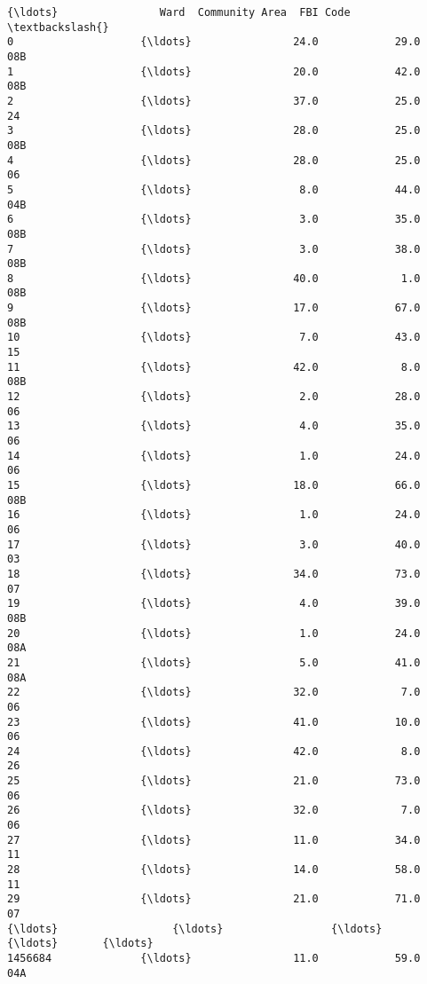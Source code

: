 \documentclass[11pt]{article}
\begin{document}
\begin{Verbatim}[commandchars=\\\{\}]
                     {\ldots}                Ward  Community Area  FBI Code  \textbackslash{}
0                    {\ldots}                24.0            29.0       08B   
1                    {\ldots}                20.0            42.0       08B   
2                    {\ldots}                37.0            25.0        24   
3                    {\ldots}                28.0            25.0       08B   
4                    {\ldots}                28.0            25.0        06   
5                    {\ldots}                 8.0            44.0       04B   
6                    {\ldots}                 3.0            35.0       08B   
7                    {\ldots}                 3.0            38.0       08B   
8                    {\ldots}                40.0             1.0       08B   
9                    {\ldots}                17.0            67.0       08B   
10                   {\ldots}                 7.0            43.0        15   
11                   {\ldots}                42.0             8.0       08B   
12                   {\ldots}                 2.0            28.0        06   
13                   {\ldots}                 4.0            35.0        06   
14                   {\ldots}                 1.0            24.0        06   
15                   {\ldots}                18.0            66.0       08B   
16                   {\ldots}                 1.0            24.0        06   
17                   {\ldots}                 3.0            40.0        03   
18                   {\ldots}                34.0            73.0        07   
19                   {\ldots}                 4.0            39.0       08B   
20                   {\ldots}                 1.0            24.0       08A   
21                   {\ldots}                 5.0            41.0       08A   
22                   {\ldots}                32.0             7.0        06   
23                   {\ldots}                41.0            10.0        06   
24                   {\ldots}                42.0             8.0        26   
25                   {\ldots}                21.0            73.0        06   
26                   {\ldots}                32.0             7.0        06   
27                   {\ldots}                11.0            34.0        11   
28                   {\ldots}                14.0            58.0        11   
29                   {\ldots}                21.0            71.0        07   
{\ldots}                  {\ldots}                 {\ldots}             {\ldots}       {\ldots}   
1456684              {\ldots}                11.0            59.0       04A   

\end{Verbatim}
\end{document}

